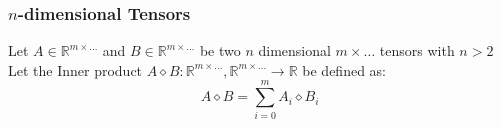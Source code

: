 \documentclass[12pt]{article}
\newcommand{\source}[1]{\caption*{Source: {#1}} }
\begin{document}
\subsubsection{\(n\)-dimensional Tensors}
Let \(A \in \mathbb{R}^{m \times \dots}\) and \(B \in \mathbb{R}^{m \times \dots}\) be two \(n\) dimensional \(m \times \dots\) tensors with \(n > 2\)\\
Let the Inner product \(A \diamond B : \mathbb{R}^{m \times \dots}, \mathbb{R}^{m \times \dots} \to \mathbb{R}\) be defined as:
\begin{equation}\label{eq:defs:Inner_product_3d}
A \diamond B = \sum_{i=0}^{m} A_{i} \diamond B_{i}
\end{equation}
%
%    
\end{document}
